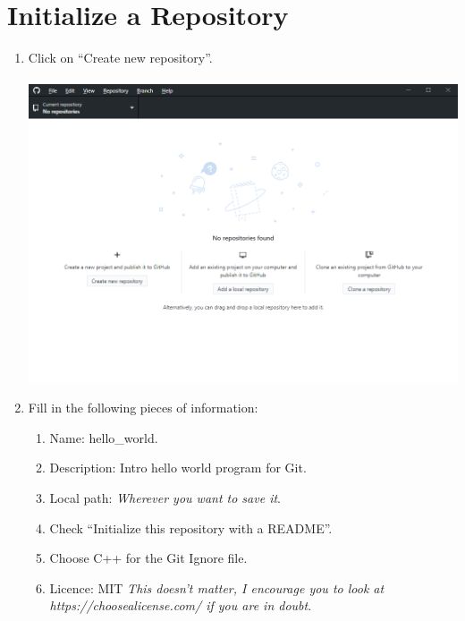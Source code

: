 \documentclass[12pt, letter]{article}
\begin{document}
    \section{Initialize a Repository}
    \begin{enumerate}  
        \item Click on ``Create new repository''. \\ \\
        \includegraphics{screenshots/shot1.bmp}
        
        \item Fill in the following pieces of information:
        
        \begin{enumerate}
            
            \item Name: hello\_world.
            
            \item Description: Intro hello world program for Git.
            
            \item Local path: \emph{Wherever you want to save it}.
            
            \item Check ``Initialize this repository with a README''.
            
            \item Choose C++ for the Git Ignore file.
            
            \item Licence: MIT \emph{This doesn't matter, I encourage you to look at https://choosealicense.com/ if you are in doubt}.
            

\end{enumerate}
\end{enumerate}
\end{document}
